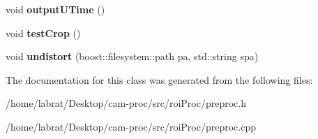 \begin{DoxyCompactItemize}
\item 
void {\bfseries output\+U\+Time} ()\hypertarget{classpreProc_abf50e06d7b6d3999cf790e3c2ffc4f78}{}\label{classpreProc_abf50e06d7b6d3999cf790e3c2ffc4f78}

\item 
void {\bfseries test\+Crop} ()\hypertarget{classpreProc_a0e7ce68c3883a71ef612b866ecacd0d0}{}\label{classpreProc_a0e7ce68c3883a71ef612b866ecacd0d0}

\item 
void {\bfseries undistort} (boost\+::filesystem\+::path pa, std\+::string spa)\hypertarget{classpreProc_acc59ff6dd35068c8c11f8e08941e0b6f}{}\label{classpreProc_acc59ff6dd35068c8c11f8e08941e0b6f}

\end{DoxyCompactItemize}


The documentation for this class was generated from the following files\+:\begin{DoxyCompactItemize}
\item 
/home/labrat/\+Desktop/cam-\/proc/src/roi\+Proc/preproc.\+h\item 
/home/labrat/\+Desktop/cam-\/proc/src/roi\+Proc/preproc.\+cpp\end{DoxyCompactItemize}

